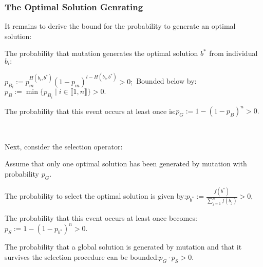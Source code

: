 \documentclass{article}
\newcommand{\assign}{:=}
\begin{document}
\subsubsection{The Optimal Solution Genrating}

It remains to derive the bound for the probability to generate an optimal
solution:

The probability that mutation generates the optimal solution ${b^{\ast}}^{}$
from individual $b_i :$

$p_{B_i} \assign p_m^{H (b_i, b^{\ast})} (1 - p_m)^{l - H (b_i, b^{\ast})} > 0
;$ Bounded below by:$p_B \assign \min \{ p_{B_i} \mid i \in \llbracket 1, n
\rrbracket \} > 0.$

The probability that this event occurs at least once is:$p_G \assign 1 - (1 -
p_B)^n > 0.$

\

Next, consider the selection operator:

Assume that only one optimal solution has been generated by mutation with
probability $p_G .$

The probability to select the optimal solution is given by:\quad$p_{b^{\ast}}
\assign \frac{f (b^{\ast})}{\sum_{j = 1}^n f (b_j)} > 0$,

The probability that this event occurs at least once becomes: $p_S \assign 1 -
(1 - p_{b^{\ast}} )^n > 0.$

The probability that a global solution is generated by mutation and that it
survives the selection procedure can be bounded:$p_G \cdot p_S > 0.$



\

\

\

\

\




\

\

\

\

\
\end{document}
